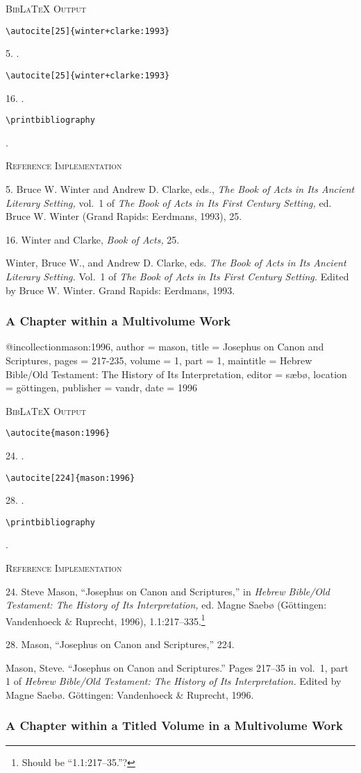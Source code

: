 \documentclass[a4paper]{article}
\newcommand\citetest[5]{%
  {\textsc{BibLaTeX Output}\par
   \nobreak
   \texttt{\textbackslash autocite[#2]\{#5\}}\par
   \color{biblatex-colour}
   #1. \cite[#2]{#5}.\par
   \color{black}
   \texttt{\textbackslash autocite[#4]\{#5\}}\par
   \color{biblatex-colour}
   #3. \cite[#4]{#5}.\par
   \color{black}
   \texttt{\textbackslash printbibliography}\par
   \color{biblatex-colour}
   \hangindent\bibindent\bibentrycite{#5}.\par}}
\newcommand\citetestnpf[4]{%
  {\textsc{BibLaTeX Output}\par
   \nobreak
   \texttt{\textbackslash autocite\{#4\}}\par
   \color{biblatex-colour}
   #1. \cite{#4}.\par
   \color{black}
   \texttt{\textbackslash autocite[#3]\{#4\}}\par
   \color{biblatex-colour}
   #2. \cite[#3]{#4}.\par
   \color{black}
   \texttt{\textbackslash printbibliography}\par
   \color{biblatex-colour}
   \hangindent\bibindent\bibentrycite{#4}.\par}}
\newenvironment{refimp}{%
  \begin{minipage}{\linewidth}
    \setlength{\parskip}{1ex}
    \textsc{Reference Implementation}\par
    \nobreak
    \color{reference-colour}
}{\end{minipage}}
\newenvironment{vb}{%
  \setlength{\parskip}{0pt}
  \verbatim}{\endverbatim}
\begin{document}
\citetest{5}{25}{16}{25}{winter+clarke:1993}

\begin{refimp}
  5. Bruce W. Winter and Andrew D. Clarke, eds., \emph{The Book of Acts in Its
  Ancient Literary Setting,} vol.~1 of \emph{The Book of Acts in Its First
  Century Setting,} ed. Bruce W. Winter (Grand Rapids: Eerdmans, 1993), 25.

  16. Winter and Clarke, \emph{Book of Acts,} 25.

  \hangindent\bibindent Winter, Bruce W., and Andrew D. Clarke, eds. \emph{The
  Book of Acts in Its Ancient Literary Setting.} Vol.~1 of \emph{The Book of
  Acts in Its First Century Setting.} Edited by Bruce W. Winter. Grand Rapids:
  Eerdmans, 1993.
\end{refimp}

\subsubsection{A Chapter within a Multivolume Work}

\begin{vb}
@incollection{mason:1996,
  author = mason,
  title = {Josephus on Canon and Scriptures},
  pages = {217-235},
  volume = {1},
  part = {1},
  maintitle = {Hebrew Bible\slash Old Testament: The History of
               Its Interpretation},
  editor = sæbø,
  location = göttingen,
  publisher = vandr,
  date = {1996}
}
\end{vb}

\citetestnpf{24}{28}{224}{mason:1996}

\begin{refimp}
  24. Steve Mason, “Josephus on Canon and Scriptures,” in \emph{Hebrew
  Bible\slash Old Testament: The History of Its Interpretation,} ed. Magne
  Saebø (Göttingen: Vandenhoeck \& Ruprecht, 1996),
  1.1:217–335.\footnote{Should be “1.1:217–35.”?}

  28. Mason, “Josephus on Canon and Scriptures,” 224.

  \hangindent\bibindent Mason, Steve. “Josephus on Canon and Scriptures.”
  Pages 217–35 in vol.~1, part 1 of \emph{Hebrew Bible\slash Old Testament:
  The History of Its Interpretation.} Edited by Magne Saebø. Göttingen:
  Vandenhoeck \& Ruprecht, 1996.
\end{refimp}

\subsubsection{A Chapter within a Titled Volume in a Multivolume Work}
\end{document}
